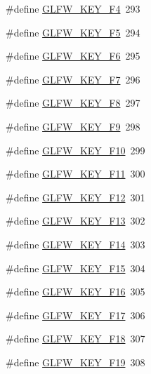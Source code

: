 \begin{DoxyCompactItemize}
\item 
\#define \mbox{\hyperlink{group__keys_ga9b61ebd0c63b44b7332fda2c9763eaa6}{G\+L\+F\+W\+\_\+\+K\+E\+Y\+\_\+\+F4}}~293
\item 
\#define \mbox{\hyperlink{group__keys_gaf258dda9947daa428377938ed577c8c2}{G\+L\+F\+W\+\_\+\+K\+E\+Y\+\_\+\+F5}}~294
\item 
\#define \mbox{\hyperlink{group__keys_ga6dc2d3f87b9d51ffbbbe2ef0299d8e1d}{G\+L\+F\+W\+\_\+\+K\+E\+Y\+\_\+\+F6}}~295
\item 
\#define \mbox{\hyperlink{group__keys_gacca6ef8a2162c52a0ac1d881e8d9c38a}{G\+L\+F\+W\+\_\+\+K\+E\+Y\+\_\+\+F7}}~296
\item 
\#define \mbox{\hyperlink{group__keys_gac9d39390336ae14e4a93e295de43c7e8}{G\+L\+F\+W\+\_\+\+K\+E\+Y\+\_\+\+F8}}~297
\item 
\#define \mbox{\hyperlink{group__keys_gae40de0de1c9f21cd26c9afa3d7050851}{G\+L\+F\+W\+\_\+\+K\+E\+Y\+\_\+\+F9}}~298
\item 
\#define \mbox{\hyperlink{group__keys_ga718d11d2f7d57471a2f6a894235995b1}{G\+L\+F\+W\+\_\+\+K\+E\+Y\+\_\+\+F10}}~299
\item 
\#define \mbox{\hyperlink{group__keys_ga0bc04b11627e7d69339151e7306b2832}{G\+L\+F\+W\+\_\+\+K\+E\+Y\+\_\+\+F11}}~300
\item 
\#define \mbox{\hyperlink{group__keys_gaf5908fa9b0a906ae03fc2c61ac7aa3e2}{G\+L\+F\+W\+\_\+\+K\+E\+Y\+\_\+\+F12}}~301
\item 
\#define \mbox{\hyperlink{group__keys_gad637f4308655e1001bd6ad942bc0fd4b}{G\+L\+F\+W\+\_\+\+K\+E\+Y\+\_\+\+F13}}~302
\item 
\#define \mbox{\hyperlink{group__keys_gaf14c66cff3396e5bd46e803c035e6c1f}{G\+L\+F\+W\+\_\+\+K\+E\+Y\+\_\+\+F14}}~303
\item 
\#define \mbox{\hyperlink{group__keys_ga7f70970db6e8be1794da8516a6d14058}{G\+L\+F\+W\+\_\+\+K\+E\+Y\+\_\+\+F15}}~304
\item 
\#define \mbox{\hyperlink{group__keys_gaa582dbb1d2ba2050aa1dca0838095b27}{G\+L\+F\+W\+\_\+\+K\+E\+Y\+\_\+\+F16}}~305
\item 
\#define \mbox{\hyperlink{group__keys_ga972ce5c365e2394b36104b0e3125c748}{G\+L\+F\+W\+\_\+\+K\+E\+Y\+\_\+\+F17}}~306
\item 
\#define \mbox{\hyperlink{group__keys_gaebf6391058d5566601e357edc5ea737c}{G\+L\+F\+W\+\_\+\+K\+E\+Y\+\_\+\+F18}}~307
\item 
\#define \mbox{\hyperlink{group__keys_gaec011d9ba044058cb54529da710e9791}{G\+L\+F\+W\+\_\+\+K\+E\+Y\+\_\+\+F19}}~308

\end{DoxyCompactItemize}
